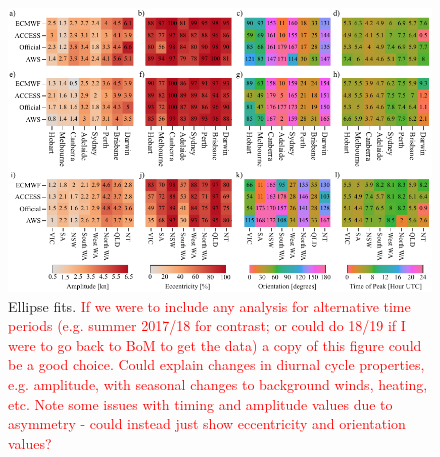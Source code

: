 \documentclass{ametsoc}
\begin{document}
\begin{figure}
\centering
\includegraphics[width=39pc]{ellipse_fits.pdf}
\caption{Ellipse fits. \textcolor{red}{If we were to include any analysis for alternative time periods (e.g. summer 2017/18 for contrast; or could do 18/19 if I were to go back to BoM to get the data) a copy of this figure could be a good choice. Could explain changes in diurnal cycle properties, e.g. amplitude, with seasonal changes to background winds, heating, etc. Note some issues with timing and amplitude values due to asymmetry - could instead just show eccentricity and orientation values?}}
\label{Fig:ellipse_fits}
\end{figure}
\end{document}
